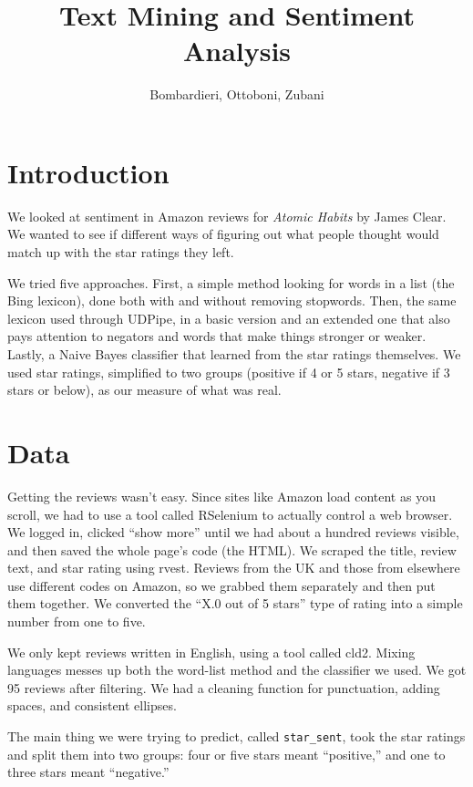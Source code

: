 \documentclass[12pt, a4paper]{article}
\title{\textbf{Text Mining and Sentiment Analysis}}
\author{Bombardieri, Ottoboni, Zubani}
\date{}
\begin{document}
\maketitle

\section{Introduction}

We looked at sentiment in Amazon reviews for \textit{Atomic Habits} by James Clear. We wanted to see if different ways of figuring out what people thought would match up with the star ratings they left.

We tried five approaches. First, a simple method looking for words in a list (the Bing lexicon), done both with and without removing stopwords. Then, the same lexicon used through UDPipe, in a basic version and an extended one that also pays attention to negators and words that make things stronger or weaker. Lastly, a Naive Bayes classifier that learned from the star ratings themselves. We used star ratings, simplified to two groups (positive if 4 or 5 stars, negative if 3 stars or below), as our measure of what was real.

\section{Data}

Getting the reviews wasn't easy. Since sites like Amazon load content as you scroll, we had to use a tool called RSelenium to actually control a web browser. We logged in, clicked ``show more'' until we had about a hundred reviews visible, and then saved the whole page's code (the HTML). We scraped the title, review text, and star rating using rvest. Reviews from the UK and those from elsewhere use different codes on Amazon, so we grabbed them separately and then put them together. We converted the ``X.0 out of 5 stars'' type of rating into a simple number from one to five.

We only kept reviews written in English, using a tool called cld2. Mixing languages messes up both the word-list method and the classifier we used. We got 95 reviews after filtering. We had a cleaning function for punctuation, adding spaces, and consistent ellipses.

The main thing we were trying to predict, called \texttt{star\_sent}, took the star ratings and split them into two groups: four or five stars meant ``positive,'' and one to three stars meant ``negative.''
\end{document}
